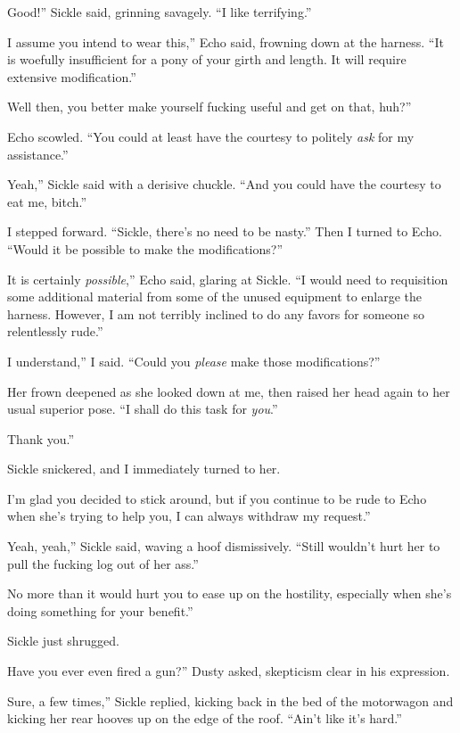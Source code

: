 \leavevmode{}Good!” Sickle said, grinning savagely. “I like terrifying.”

\leavevmode{}I assume you intend to wear this,” Echo said, frowning down at the harness. “It is woefully insufficient for a pony of your girth and length. It will require extensive modification.”

\leavevmode{}Well then, you better make yourself fucking useful and get on that, huh?”

Echo scowled. “You could at least have the courtesy to politely \textit{ask} for my assistance.”

\leavevmode{}Yeah,” Sickle said with a derisive chuckle. “And you could have the courtesy to eat me, bitch.”

I stepped forward. “Sickle, there’s no need to be nasty.” Then I turned to Echo. “Would it be possible to make the modifications?”

\leavevmode{}It is certainly \textit{possible},” Echo said, glaring at Sickle. “I would need to requisition some additional material from some of the unused equipment to enlarge the harness. However, I am not terribly inclined to do any favors for someone so relentlessly rude.”

\leavevmode{}I understand,” I said. “Could you \textit{please} make those modifications?”

Her frown deepened as she looked down at me, then raised her head again to her usual superior pose. “I shall do this task for \textit{you}.”

\leavevmode{}Thank you.”

Sickle snickered, and I immediately turned to her.

\leavevmode{}I’m glad you decided to stick around, but if you continue to be rude to Echo when she’s trying to help you, I can always withdraw my request.”

\leavevmode{}Yeah, yeah,” Sickle said, waving a hoof dismissively. “Still wouldn’t hurt her to pull the fucking log out of her ass.”

\leavevmode{}No more than it would hurt you to ease up on the hostility, especially when she’s doing something for your benefit.”

Sickle just shrugged.

\leavevmode{}Have you ever even fired a gun?” Dusty asked, skepticism clear in his expression.

\leavevmode{}Sure, a few times,” Sickle replied, kicking back in the bed of the motorwagon and kicking her rear hooves up on the edge of the roof. “Ain’t like it’s hard.”


